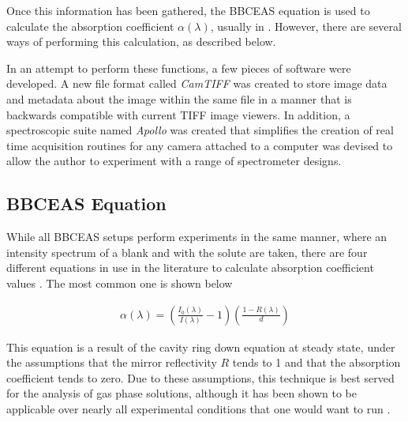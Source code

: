 Once this information has been gathered, the \ac{BBCEAS} equation is used
to calculate the absorption coefficient $\alpha(\lambda)$, usually in \icm.
However, there are several ways of performing this calculation, as described
below.


In an attempt to perform these functions, a few pieces of software were
developed. A new file format called \emph{CamTIFF} was created to store
image data and metadata about the image within the same file in a manner
that is backwards compatible with current TIFF image viewers. In addition,
a spectroscopic suite named \emph{Apollo} was created that simplifies the
creation of real time acquisition routines for any camera attached to a
computer was devised to allow the author to experiment with a range of
spectrometer designs.



\subsection{BBCEAS Equation}\label{subsec:bbceas_eq}


While all \ac{BBCEAS} setups perform experiments in the same manner, where an
intensity spectrum of a blank and with the solute are taken, there are four
different equations in use in the literature to calculate absorption
coefficient values \cite{Mazurenka:2005fh}. The most common one is shown below

  \begin{align}
    \alpha(\lambda) = \left(\frac{I_0(\lambda)}{I(\lambda)}-1\right)\left(\frac{1-R(\lambda)}{d}\right)\label{eq:ceas_std}
  \end{align}


This equation is a result of the cavity ring down equation at steady state,
under the assumptions that the mirror reflectivity $R$ tends to 1 and that the
absorption coefficient tends to zero. Due to these assumptions, this technique
is best served for the analysis of gas phase solutions, although it has been
shown to be applicable over nearly all experimental conditions that one would
want to run \cite{Mazurenka:2005fh}.

